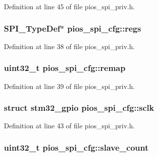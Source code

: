\-Definition at line 45 of file pios\-\_\-spi\-\_\-priv.\-h.

\hypertarget{structpios__spi__cfg_ad167dc65625a3dd4255886c4523b5691}{
\subsubsection[{regs}]{\setlength{\rightskip}{0pt plus 5cm}\-S\-P\-I\-\_\-\-Type\-Def$\ast$ {\bf pios\-\_\-spi\-\_\-cfg\-::regs}}}\label{structpios__spi__cfg_ad167dc65625a3dd4255886c4523b5691}


\-Definition at line 38 of file pios\-\_\-spi\-\_\-priv.\-h.

\hypertarget{structpios__spi__cfg_a1318cbf732716210fffe77ecf7e14649}{
\subsubsection[{remap}]{\setlength{\rightskip}{0pt plus 5cm}uint32\-\_\-t {\bf pios\-\_\-spi\-\_\-cfg\-::remap}}}\label{structpios__spi__cfg_a1318cbf732716210fffe77ecf7e14649}


\-Definition at line 39 of file pios\-\_\-spi\-\_\-priv.\-h.

\hypertarget{structpios__spi__cfg_aa190920ba828502df22a5f665027b20d}{
\subsubsection[{sclk}]{\setlength{\rightskip}{0pt plus 5cm}struct {\bf stm32\-\_\-gpio} {\bf pios\-\_\-spi\-\_\-cfg\-::sclk}}}\label{structpios__spi__cfg_aa190920ba828502df22a5f665027b20d}


\-Definition at line 43 of file pios\-\_\-spi\-\_\-priv.\-h.

\hypertarget{structpios__spi__cfg_ad45aed059de6082ab6c257da0018d867}{
\subsubsection[{slave\-\_\-count}]{\setlength{\rightskip}{0pt plus 5cm}uint32\-\_\-t {\bf pios\-\_\-spi\-\_\-cfg\-::slave\-\_\-count}}}\label{structpios__spi__cfg_ad45aed059de6082ab6c257da0018d867}


